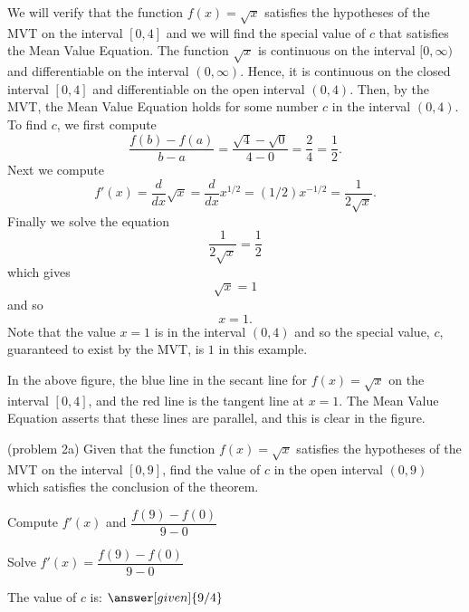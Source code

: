 \documentclass{ximera}
\begin{document}
\begin{example}[example 2]
We will verify that the function $f(x) = \sqrt x$ satisfies the hypotheses of the MVT
on the interval $[0,4]$ and we will find the special value of $c$ that satisfies the Mean Value Equation.
The function $\sqrt x$ is continuous on the interval $[0, \infty)$  and differentiable on the interval $(0, \infty)$. 
Hence, it is continuous on the closed interval $[0, 4]$ and differentiable on the open interval $(0, 4)$. 
Then, by the MVT,  the Mean Value Equation holds for some number 
$c$ in the interval $(0, 4)$. To find $c$, we first compute
\[\frac{f(b) - f(a)}{b-a} = \frac{\sqrt 4 - \sqrt 0}{4-0} = \frac{2}{4} = \frac{1}{2}.\]
Next we compute
\[f'(x) = \frac{d}{dx} \sqrt x = \frac{d}{dx} x^{1/2} = (1/2)x^{-1/2} = \frac{1}{2\sqrt x}.\]
Finally we solve the equation
\[\frac{1}{2\sqrt x} = \frac{1}{2}\]
which gives
\[\sqrt x = 1\]
and so 
\[ x=1.\]
Note that the value $x = 1$ is in the interval $(0,4)$ and so the special value, $c$, guaranteed to exist by the MVT,
is $1$ in this example.


\begin{image}
\end{image}

In the above figure, the blue line in the secant line for $f(x) = \sqrt x$ on the interval $[0, 4]$, 
and the red line is the tangent line at $x = 1$. The Mean Value Equation asserts that these lines are parallel, and this
is clear in the figure.
\end{example}

\begin{problem}(problem 2a)
  Given that the function $f(x) = \sqrt x$ satisfies the hypotheses of the MVT on the
	interval $[0,9]$, find the value of $c$ in the open interval $(0,9)$ which satisfies 
	the conclusion of the theorem.
	
    \begin{hint}
      Compute $f'(x)$ and $\dfrac{f(9) - f(0)}{9-0}$
    \end{hint}
		\begin{hint}
		  Solve $f'(x) = \dfrac{f(9) - f(0)}{9-0}$
		\end{hint}
		
		The value of $c$ is:
		 $\answer[given]{9/4}$
\end{problem}
\end{document}

